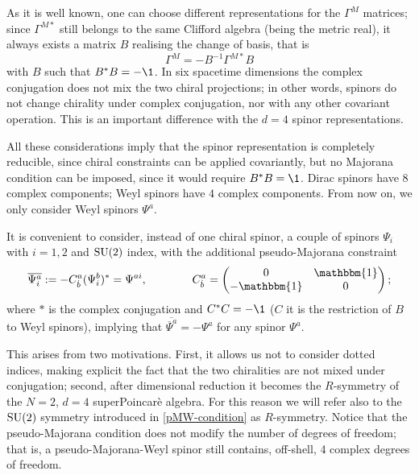 As it is well known, one can choose different representations for the $\Gamma^M$ matrices; since $\Gamma^{M*}$ still belongs to the same Clifford algebra (being the metric real), it always exists a matrix $B$ realising the change of basis, that is
\begin{equation}
\Gamma^M = -  B^{-1} \Gamma^{M *}  B
\end{equation}
with $ B$ such that
\(  B^*  B = -\1 \).
In six spacetime dimensions the complex conjugation does not mix the two chiral projections; in other words, spinors do not change chirality under complex conjugation, nor with any other covariant operation. This is an important difference with the $d=4$ spinor representations.

All these considerations imply that the spinor representation is completely reducible, since chiral constraints can be applied covariantly, but no Majorana condition can be imposed, since it would require $B^*B = \1$. Dirac spinors have $8$ complex components; Weyl spinors have $4$ complex components.
From now on, we only consider Weyl spinors $\Psi^a$.



It is convenient to consider, instead of one chiral spinor, a couple of spinors $\Psi_i$ with $i=1,2$ and  ${ \text{SU} }(2)$ index, with the additional pseudo-Majorana %
   constraint
\begin{equation}\label{pMW-condition}
	\overline{\Psi^a_i}
		:=
	- C^a_{\dot{b}} (\Psi^b_i)^*
		=
	\Psi^{ai},
%
\qquad\qquad
%
	C^a_{\dot{b}}
		=
	\begin{pmatrix}
		0 & \mathbbm{1} \\
		-\mathbbm{1} & 0
	\end{pmatrix};
\end{equation}where $*$ is the complex conjugation and $C^*C=-\1$ ($C$ it is the restriction of $B$ to Weyl spinors), implying  that \( \overline{\overline{\Psi}^a } = - \Psi^a \) for any spinor $\Psi^a$.


This arises from two motivations. First, it allows us not to consider dotted indices, making explicit the fact that the two chiralities are not mixed under conjugation; second, after dimensional reduction it becomes the $R$-symmetry of the $N=2$, $d=4$ superPoincar\`e algebra. For this reason we will refer also to the ${ \text{SU} }(2)$ symmetry introduced in \eqref{pMW-condition} as $R$-symmetry. Notice that the pseudo-Majorana condition does not modify the number of degrees of freedom; that is, a pseudo-Majorana-Weyl spinor still contains, off-shell, 4 complex degrees of freedom.




